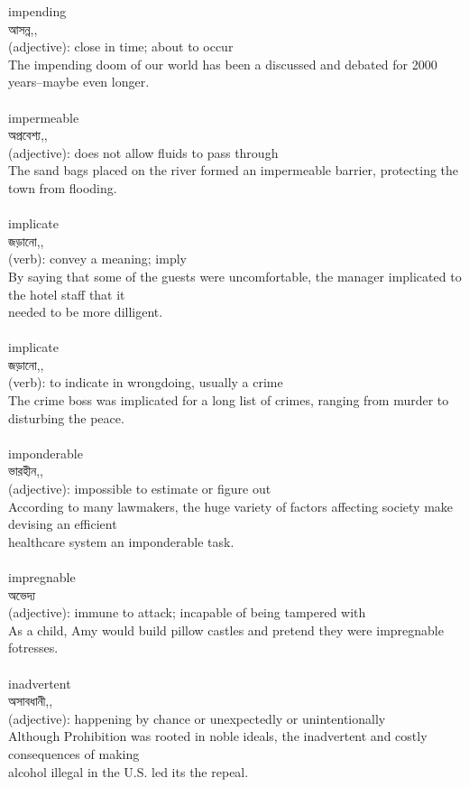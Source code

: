 \documentclass{article}
\begin{document}
{impending}\\
{আসন্ন,,}\\
{(adjective): close in time; about to occur\\The impending doom of our world has been a discussed and debated for 2000 years--maybe even longer.\\}\\
{impermeable}\\
{অপ্রবেশ্য,,}\\
{(adjective): does not allow fluids to pass through\\The sand bags placed on the river formed an impermeable barrier, protecting the town from flooding.\\}\\
{implicate}\\
{জড়ানো,,}\\
{(verb): convey a meaning; imply\\By saying that some of the guests were uncomfortable, the manager implicated to the hotel staff that it\\needed to be more dilligent.\\}\\
{implicate}\\
{জড়ানো,,}\\
{(verb): to indicate in wrongdoing, usually a crime\\The crime boss was implicated for a long list of crimes, ranging from murder to disturbing the peace.\\}\\
{imponderable}\\
{ভারহীন,,}\\
{(adjective): impossible to estimate or figure out\\According to many lawmakers, the huge variety of factors affecting society make devising an efficient\\healthcare system an imponderable task.\\}\\
{impregnable}\\
{অভেদ্য}\\
{(adjective): immune to attack; incapable of being tampered with\\As a child, Amy would build pillow castles and pretend they were impregnable fotresses.\\}\\
{inadvertent}\\
{অসাবধানী,,}\\
{(adjective): happening by chance or unexpectedly or unintentionally\\Although Prohibition was rooted in noble ideals, the inadvertent and costly consequences of making\\alcohol illegal in the U.S. led its the repeal.\\}\\
\end{document}
